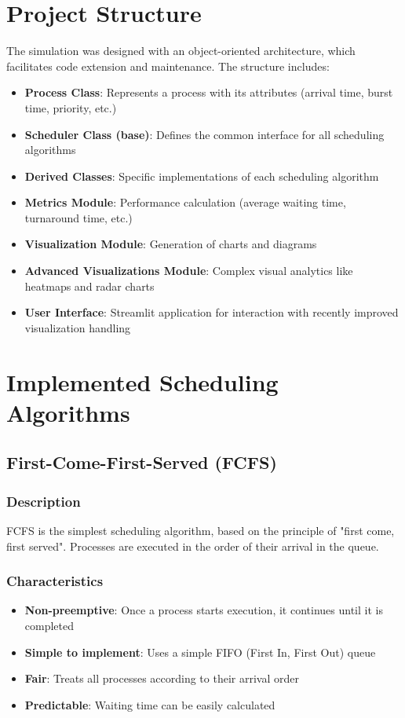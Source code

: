 \documentclass[12pt,a4paper]{article}
\begin{document}
\section{Project Structure}
The simulation was designed with an object-oriented architecture, which facilitates code extension and maintenance. The structure includes:

\begin{itemize}
    \item \textbf{Process Class}: Represents a process with its attributes (arrival time, burst time, priority, etc.)
    \item \textbf{Scheduler Class (base)}: Defines the common interface for all scheduling algorithms
    \item \textbf{Derived Classes}: Specific implementations of each scheduling algorithm
    \item \textbf{Metrics Module}: Performance calculation (average waiting time, turnaround time, etc.)
    \item \textbf{Visualization Module}: Generation of charts and diagrams
    \item \textbf{Advanced Visualizations Module}: Complex visual analytics like heatmaps and radar charts
    \item \textbf{User Interface}: Streamlit application for interaction with recently improved visualization handling
\end{itemize}

\section{Implemented Scheduling Algorithms}
\subsection{First-Come-First-Served (FCFS)}
\subsubsection{Description}
FCFS is the simplest scheduling algorithm, based on the principle of "first come, first served". Processes are executed in the order of their arrival in the queue.

\subsubsection{Characteristics}
\begin{itemize}
    \item \textbf{Non-preemptive}: Once a process starts execution, it continues until it is completed
    \item \textbf{Simple to implement}: Uses a simple FIFO (First In, First Out) queue
    \item \textbf{Fair}: Treats all processes according to their arrival order
    \item \textbf{Predictable}: Waiting time can be easily calculated
\end{itemize}
\end{document}
